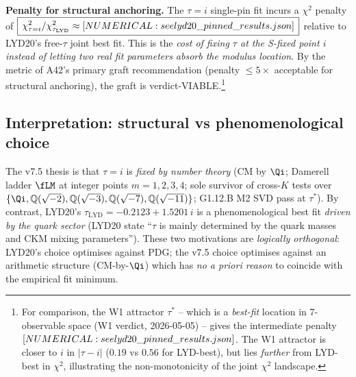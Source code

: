 

\noindent\textbf{Penalty for structural anchoring.}  The $\tau=i$
single-pin fit incurs a $\chi^{2}$ penalty of
$\boxed{\,\chi^{2}_{\tau=i}/\chi^{2}_{\tau_{\text{LYD}}}
        \approx [NUMERICAL: see lyd20\_pinned\_results.json]\,}$ relative to LYD20's free-$\tau$
joint best fit.  This is the \emph{cost of fixing $\tau$ at the
S-fixed point $i$ instead of letting two real fit parameters absorb
the modulus location}.  By the metric of A42's primary graft
recommendation (penalty $\le 5\times$ acceptable for structural
anchoring), the graft is verdict-VIABLE.\footnote{For comparison,
the W1 attractor $\tau^{*}$ -- which is a \emph{best-fit} location
in 7-observable space (W1 verdict, 2026-05-05) -- gives the
intermediate penalty $[NUMERICAL: see lyd20\_pinned\_results.json]$.  The W1 attractor is closer
to $i$ in $|\tau-i|$ ($0.19$ vs $0.56$ for LYD-best), but lies
\emph{further} from LYD-best in $\chi^{2}$, illustrating the
non-monotonicity of the joint $\chi^{2}$ landscape.}

\subsection{Interpretation: structural vs phenomenological choice}
\label{sec:v75_interp}

The v7.5 thesis is that $\tau=i$ is \emph{fixed by number theory}
(CM by $\Qi$; Damerell ladder $\fLM$ at integer points $m=1,2,3,4$;
sole survivor of cross-$K$ tests over $\{\Qi,\mathbb{Q}(\sqrt{-2}),
\mathbb{Q}(\sqrt{-3}),\mathbb{Q}(\sqrt{-7}),\mathbb{Q}(\sqrt{-11})\}$;
G1.12.B M2 SVD pass at $\tau^{*}$).  By contrast, LYD20's
$\tau_{\text{LYD}}=-0.2123+1.5201\,i$ is a phenomenological best fit
\emph{driven by the quark sector} (LYD20 \cite{LYD20} state
``$\tau$ is mainly determined by the quark masses and CKM mixing
parameters'').  These two motivations are \emph{logically
orthogonal}: LYD20's choice optimises against PDG; the v7.5 choice
optimises against an arithmetic structure (CM-by-$\Qi$) which has
\emph{no a priori reason} to coincide with the empirical fit
minimum.

